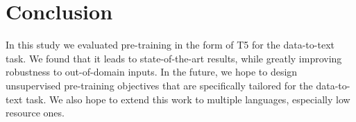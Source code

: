\documentclass[11pt,a4paper]{article}
\begin{document}
\section{Conclusion}
In this study we evaluated pre-training in the form of T5 for the data-to-text task. We found that it leads to state-of-the-art results, while greatly improving robustness to out-of-domain inputs. In the future, we hope to design unsupervised pre-training objectives that are specifically tailored for the data-to-text task. 
We also hope to extend this work to multiple languages, especially low resource ones.



\end{document}
